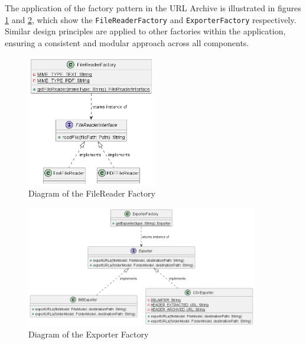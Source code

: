 The application of the factory pattern in the URL Archive is illustrated in figures \ref{fig:FileReaderFactory_Diagram} and \ref{fig:ExporterFactory_Diagram}, which show the \texttt{FileReaderFactory} and \texttt{ExporterFactory} respectively. Similar design principles are applied to other factories within the application, ensuring a consistent and modular approach across all components.

\begin{figure}[h!]
    \center
    \includegraphics[width=0.5\textwidth]{pictures/FileReaderFactory-0.png}
    \caption{Diagram of the FileReader Factory}
    \label{fig:FileReaderFactory_Diagram}
\end{figure}

\begin{figure}[h!]
    \center
    \includegraphics[width=0.9\textwidth]{pictures/ExporterFactory-0.png}
    \caption{Diagram of the Exporter Factory}
    \label{fig:ExporterFactory_Diagram}
\end{figure}
\clearpage

